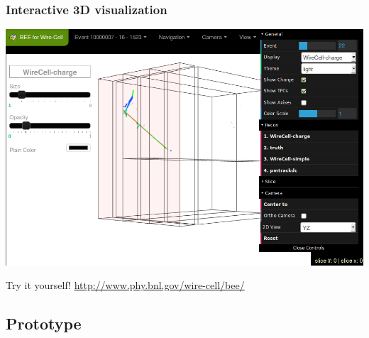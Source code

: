 \documentclass[xcolor=dvipsnames]{beamer}
\begin{document}
\begin{frame}
  \frametitle{Interactive 3D visualization}
  \begin{center}
    \includegraphics[height=0.7\textheight]{bee-full-gui.png}    
  \end{center}
  \begin{center}
    Try it yourself! \url{http://www.phy.bnl.gov/wire-cell/bee/}
  \end{center}
\end{frame}


\subsection{Prototype}
\end{document}

